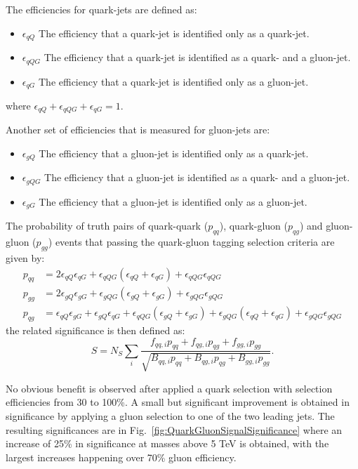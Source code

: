The efficiencies for quark-jets are defined as:

\begin{itemize}
\item $\epsilon_{qQ}$ The efficiency that a quark-jet is identified only as a quark-jet. 
\item $\epsilon_{qQG}$ The efficiency that a quark-jet is identified as a quark- and a gluon-jet.
\item $\epsilon_{qG}$ The efficiency that a quark-jet is identified only as a gluon-jet.  
\end{itemize}
where $\epsilon_{qQ} + \epsilon_{qQG} + \epsilon_{qG} = 1$. 

Another set of efficiencies that is measured for gluon-jets are:
\begin{itemize}
\item $\epsilon_{gQ}$ The efficiency that a gluon-jet is identified only as a quark-jet. 
\item $\epsilon_{gQG}$ The efficiency that a gluon-jet is identified  as a quark- and a gluon-jet.
\item $\epsilon_{gG}$ The efficiency that a gluon-jet is identified only as a gluon-jet.  
\end{itemize}

The probability of truth pairs of quark-quark ($p_{qq}$), quark-gluon ($p_{qg}$) and gluon-gluon ($p_{gg}$) events that passing the quark-gluon tagging selection criteria are given by:
\begin{align}
p_{qq} & = 2  \epsilon_{qQ}\epsilon_{qG} + \epsilon_{qQG}\left( \epsilon_{qQ} + \epsilon_{qG} \right)  + \epsilon_{qQG}\epsilon_{qQG} \\
p_{gg} & = 2  \epsilon_{gQ}\epsilon_{gG} + \epsilon_{gQG}\left( \epsilon_{gQ} + \epsilon_{gG} \right)  + \epsilon_{gQG}\epsilon_{gQG} \\
p_{qg} & = \epsilon_{qQ}\epsilon_{gG} + \epsilon_{gQ}\epsilon_{qG} + \epsilon_{qQG}\left( \epsilon_{gQ} + \epsilon_{gG} \right) 
+ \epsilon_{gQG}\left( \epsilon_{qQ} + \epsilon_{qG} \right) 
+ \epsilon_{gQG}\epsilon_{gQG}
\end{align}
the related significance is then defined as:
\begin{equation}
S = N_S \sum_i{ \dfrac{ f_{qq,i} p_{qq} + f_{qg,i}p_{qg} + f_{gg,i}p_{gg}  } {\sqrt{ B_{qq,i}p_{qq} + B_{qg,i}p_{qg} + B_{gg,i}p_{gg}  }}}.
\end{equation}

No obvious benefit is observed after applied a quark selection with selection efficiencies from 30 to 100\%. A small but significant improvement is obtained in significance by applying a gluon selection to one of the two leading jets.
The resulting significances are  in Fig.~\ref{fig:QuarkGluonSignalSignificance} where an increase of 25\% in significance at masses above 5 TeV is obtained, with the largest increases happening over 70\% gluon efficiency.

